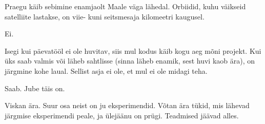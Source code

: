 Praegu käib sebimine enamjaolt Maale väga lähedal. Orbiidid, kuhu 
väikseid satelliite lastakse, on viie- kuni seitsmesaja kilomeetri kaugusel.


Ei.


Isegi kui päevatööl ei ole huvitav, siis mul 
kodus käib kogu aeg mõni projekt. Kui üks saab valmis või läheb 
sahtlisse (sinna läheb enamik, sest huvi kaob ära), on 
järgmine kohe laual. Sellist asja ei ole, et mul ei ole midagi teha.


Saab. Jube täis on. 


Viskan ära. Suur osa neist on ju eksperimendid. Võtan ära tükid, mis lähevad  
järgmise eksperimendi peale, ja ülejäänu on prügi. Teadmised jäävad alles.

